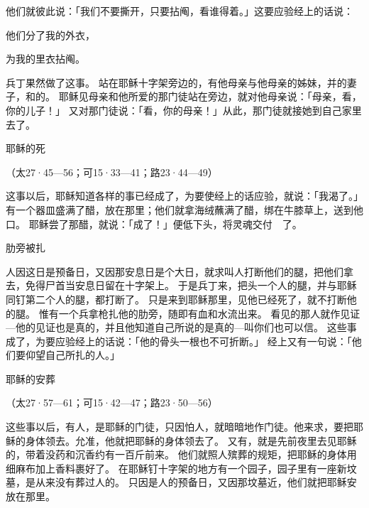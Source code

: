 {他们就彼此说：「我们不要撕开，只要拈阄，看谁得着。」这要应验经上的话说：
\par }{\Q 他们分了我的外衣，
\par }{\Q 为我的里衣拈阄。
\par }{\MM 兵丁果然做了这事。
站在耶稣十字架旁边的，有他母亲与他母亲的姊妹，并{}的妻子{}，和{}的{}。
耶稣见母亲和他所爱的那门徒站在旁边，就对他母亲说：「母亲，看，你的儿子！」
又对那门徒说：「看，你的母亲！」从此，那门徒就接她到自己家里去了。
\par }{\SH 耶稣的死
\par }{\R （太27·45—56；可15·33—41；路23·44—49）
\par }{\PP {}这事以后，耶稣知道各样的事已经成了，为要使经上的话应验，就说：「我渴了。」
有一个器皿盛满了醋，放在那里；他们就拿海绒蘸满了醋，绑在牛膝草上，送到他口。
耶稣尝了那醋，就说：「成了！」便低下头，将灵魂交付　{}了。
\par }{\SH 肋旁被扎
\par }{\PP {}人因这日是预备日，又因那安息日是个大日，就求{}叫人打断他们的腿，把他们拿去，免得尸首当安息日留在十字架上。
于是兵丁来，把头一个人的腿，并与耶稣同钉第二个人的腿，都打断了。
只是来到耶稣那里，见他已经死了，就不打断他的腿。
惟有一个兵拿枪扎他的肋旁，随即有血和水流出来。
看见{}的那人就作见证—他的见证也是真的，并且他知道自己所说的是真的—叫你们也可以信。
这些事成了，为要应验经上的话说：「他的骨头一根也不可折断。」
经上又有一句说：「他们要仰望自己所扎的人。」
\par }{\SH 耶稣的安葬
\par }{\R （太27·57—61；可15·42—47；路23·50—56）
\par }{\PP {}这些事以后，有{}人{}，是耶稣的门徒，只因怕{}人，就暗暗地作门徒。他来求{}，要把耶稣的身体领去。{}允准，他就把耶稣的身体领去了。
又有{}，就是先前夜里去见耶稣的，带着没药和沉香约有一百斤前来。
他们就照{}人殡葬的规矩，把耶稣的身体用细麻布加上香料裹好了。
在耶稣钉十字架的地方有一个园子，园子里有一座新坟墓，是从来没有葬过人的。
只因是{}人的预备日，又因那坟墓近，他们就把耶稣安放在那里。

}

